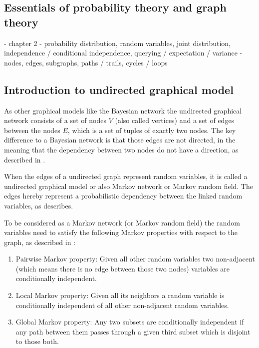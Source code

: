 \subsection{Essentials of probability theory and graph theory}

- chapter 2
- probability distribution, random variables, joint distribution, independence / conditional independence, querying / expectation / variance
- nodes, edges, subgraphs, paths / trails, cycles / loops

\subsection{Introduction to undirected graphical model}

As other graphical models like the Bayesian network the undirected graphical network consists of a set of nodes $V$ (also called vertices) and a set of edges between the nodes $E$, which is a set of tuples of exactly two nodes. The key difference to a Bayesian network is that those edges are not directed, in the meaning that the dependency between two nodes do not have a direction, as described in \cite{koller2009probabilistic}.

When the edges of a undirected graph represent random variables, it is called a undirected graphical model or also Markov network or Markov random field. The edges hereby represent a probabilistic dependency between the linked random variables, as \cite{kindermann1980markov} describes.

To be considered as a Markov network (or Markov random field) the random variables need to satisfy the following Markov properties with respect to the graph, as described in \cite{markov1957theory}:

\begin{enumerate}
\item Pairwise Markov property: Given all other random variables two non-adjacent (which means there is no edge between those two nodes) variables are conditionally independent.
\item Local Markov property: Given all its neighbors a random variable is conditionally independent of all other non-adjacent random variables.
\item Global Markov property: Any two subsets are conditionally independent if any path between them passes through a given third subset which is disjoint to those both.  
\end{enumerate}



